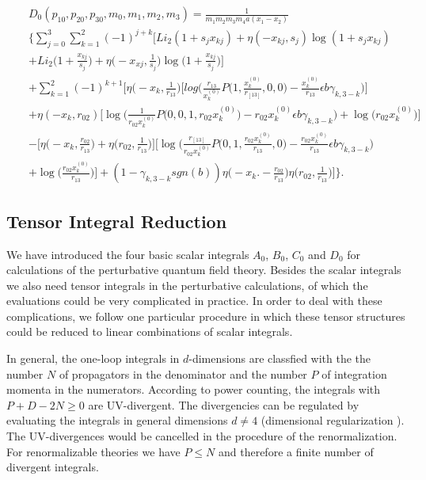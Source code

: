\begin{eqnarray}
&&D_0(p_{10},p_{20},p_{30},m_0,m_1,m_2,m_3)=\frac{1}{m_1m_2m_3m_4a(x_1-x_2)}\nonumber\\
&&\biggl\{  \sum_{j=0}^{3}\sum_{k=1}^{2}(-1)^{j+k}\biggl[ Li_2(1+s_jx_{kj})+\eta(-x_{kj},s_j)\log(1+s_jx_{kj}) \nonumber\\
&&+Li_2\biggl(1+\frac{x_{kj}}{s_j}\biggr)+\eta\biggl(-x_{xj},\frac{1}{s_j}\biggr)\log\bigg(1+\frac{x_{kj}}{s_j}\bigg)\biggr]\nonumber\\
&&+\sum_{k=1}^{2}(-1)^{k+1} \biggl[ \eta\biggl(-x_k,\frac{1}{r_{13}}\biggr)\biggl[
log\biggl(\frac{r_{13}}{x_k^{(0)}}P\biggl(1,\frac{x_k^{(0)}}{r_[13]},0,0\biggr)-\frac{x_k^{(0)}}{r_{13}}\epsilon b\gamma_{k,3-k}\biggr)\biggr] \nonumber\\
&& +\eta(-x_k,r_{02})\biggl[ \log\biggl( \frac{1}{r_{02}x_k^{(0)}}P\bigl(0,0,1,r_{02}x_k^{(0)}\bigr)-r_{02}x_k^{(0)}\epsilon b\gamma_{k,3-k}\biggr)+\log\bigl(r_{02}x_k^{(0)}\bigr) \biggr]  \nonumber\\
&&-\biggl[\eta\biggl(-x_k,\frac{r_{02}}{r_{13}}\biggr)+\eta\biggl(r_{02},\frac{1}{r_{13}}\biggr)\biggr]\biggl[ \log\biggl( \frac{r_[13]}{r_{02}x_k^{(0)}} P\biggl(0,1,\frac{r_{02}x_k^{(0)}}{r_{13}},0\biggr)-\frac{r_{02}x_k^{(0)}}{r_{13}}\epsilon b\gamma_{k,3-k} \biggr)
\nonumber\\
&&+\log\biggl(\frac{r_{02}x_k^{(0)}}{r_{13}}\biggr)\biggr]+(1-\gamma_{k,3-k}sgn(b))\eta\biggl( -x_k.-\frac{r_{02}}{r_{13}} \biggr)\eta\biggl(r_{02},\frac{1}{r_{13}}\biggr) \biggr]\biggr\}.
\end{eqnarray}

\subsection{Tensor Integral Reduction}
We have introduced the four basic scalar integrals $A_0$, $B_0$, $C_0$ and $D_0$ for calculations of the perturbative quantum field theory. Besides the scalar integrals we also need tensor integrals in the perturbative calculations, of which the evaluations could be very complicated in practice. In order to deal with these complications, we follow one particular procedure \cite{Denner,PV} in which these tensor structures could be reduced to linear combinations of scalar integrals. 

In general, the one-loop integrals in $d$-dimensions are classfied with the the number $N$ of propagators in the denominator and the number $P$ of integration momenta in the numerators. According to power counting, the integrals with $P+D-2N\geq 0$ are UV-divergent. The divergencies can be regulated by evaluating the integrals in general dimensions $d\ne 4$ (dimensional regularization \cite{tHooftVeltman}). The UV-divergences would be cancelled in the procedure of the renormalization. For renormalizable theories we have $P\leq N$ and therefore a finite number of divergent integrals.    

